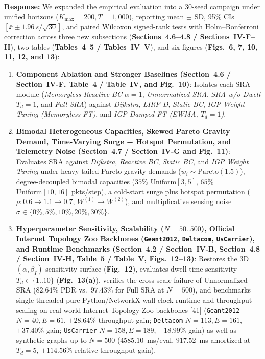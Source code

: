 \documentclass[11pt,a4paper]{article}
\begin{document}
\noindent\textbf{Response:} We expanded the empirical evaluation into a 30-seed campaign under unified horizons ($K_{\max}=200, T=1{,}000$), reporting mean $\pm$ SD, 95\% CIs $[\bar{x} \pm 1.96\,s/\sqrt{30}]$, and paired Wilcoxon signed-rank tests with Holm--Bonferroni correction across three new subsections (\textbf{Sections~4.6--4.8 / Sections~IV-F--H}), two tables (\textbf{Tables~4--5 / Tables~IV--V}), and six figures (\textbf{Figs.~6, 7, 10, 11, 12, and 13}):
\begin{enumerate}[leftmargin=1.8em]
    \item \textbf{Component Ablation and Stronger Baselines (Section~4.6 / Section~IV-F, Table~4 / Table~IV, and Fig.~10)}: Isolates each SRA module (\textit{Memoryless Reactive BC $\alpha=1$}, \textit{Unnormalized SRA}, \textit{SRA w/o Dwell $T_d=1$}, and \textit{Full SRA}) against \textit{Dijkstra}, \textit{LIRP-D}, \textit{Static BC}, \textit{IGP Weight Tuning (Memoryless FT)}, and \textit{IGP Damped FT (EWMA, $T_d=1$)}.
    \item \textbf{Bimodal Heterogeneous Capacities, Skewed Pareto Gravity Demand, Time-Varying Surge + Hotspot Permutation, and Telemetry Noise (Section~4.7 / Section~IV-G and Fig.~11)}: Evaluates SRA against \textit{Dijkstra}, \textit{Reactive BC}, \textit{Static BC}, and \textit{IGP Weight Tuning} under heavy-tailed Pareto gravity demands ($w_i \sim \mathrm{Pareto}(1.5)$), degree-decoupled bimodal capacities ($35\%$ $\mathrm{Uniform}[3,5]$, $65\%$ $\mathrm{Uniform}[10,16]$ pkts/step), a cold-start surge plus hotspot permutation ($\rho: 0.6 \to 1.1 \to 0.7$, $W^{(1)}\to W^{(2)}$), and multiplicative sensing noise $\sigma \in \{0\%, 5\%, 10\%, 20\%, 30\%\}$.
    \item \textbf{Hyperparameter Sensitivity, Scalability ($N=50..500$), Official Internet Topology Zoo Backbones (\texttt{Geant2012}, \texttt{Deltacom}, \texttt{UsCarrier}), and Runtime Benchmarks (Section~4.2 / Section~IV-B, Section~4.8 / Section~IV-H, Table~5 / Table~V, Figs.~12--13)}: Restores the 3D $(\alpha, \beta_I)$ sensitivity surface (\textbf{Fig.~12}), evaluates dwell-time sensitivity $T_d \in \{1..10\}$ (\textbf{Fig.~13(a)}), verifies the cross-scale failure of Unnormalized SRA ($82.64\%$ PDR vs.\ $97.43\%$ for Full SRA at $N=500$), and benchmarks single-threaded pure-Python/NetworkX wall-clock runtime and throughput scaling on real-world Internet Topology Zoo backbones [41] (\texttt{Geant2012} $N=40, E=61$, $+28.64\%$ throughput gain; \texttt{Deltacom} $N=113, E=161$, $+37.40\%$ gain; \texttt{UsCarrier} $N=158, E=189$, $+18.99\%$ gain) as well as synthetic graphs up to $N=500$ ($4585.10$~ms/eval, $917.52$~ms amortized at $T_d=5$, $+114.56\%$ relative throughput gain).
\end{enumerate}
\end{document}
